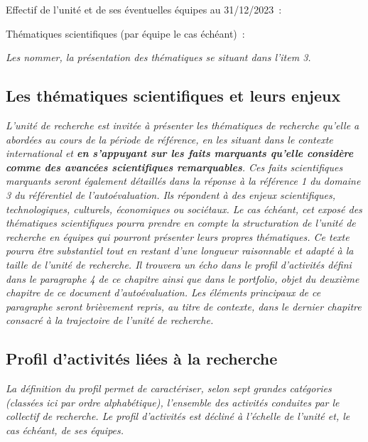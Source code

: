\documentclass[]{article}
\newcommand{\instructions}[1]{{\em \color{hceresgreen}#1}}
\begin{document}
Effectif de l'unité et de ses éventuelles équipes au 31/12/2023~:

Thématiques scientifiques (par équipe le cas échéant)~:

\instructions{Les nommer, la présentation des thématiques se situant dans l’item 3.}

\subsection{Les thématiques scientifiques et leurs enjeux}

\instructions{L’unité de recherche est invitée à présenter les thématiques de recherche qu’elle a abordées au cours de la période de référence, en les situant dans le contexte international et {\bf en s’appuyant sur les faits marquants qu’elle considère comme des avancées scientifiques remarquables}. Ces faits scientifiques marquants seront également détaillés dans la réponse à la référence 1 du domaine 3 du référentiel de l’autoévaluation. Ils répondent à des enjeux scientifiques, technologiques, culturels, économiques ou sociétaux. Le cas échéant, cet exposé des thématiques scientifiques pourra prendre en compte la structuration de l’unité de recherche en équipes qui pourront présenter leurs propres thématiques. Ce texte pourra être substantiel tout en restant d’une longueur raisonnable et adapté à la taille de l’unité de recherche. Il trouvera un écho dans le profil d’activités défini dans le paragraphe 4 de ce chapitre ainsi que dans le portfolio, objet du deuxième chapitre de ce document d’autoévaluation. Les éléments principaux de ce paragraphe seront brièvement repris, au titre de contexte, dans le dernier chapitre consacré à la trajectoire de l’unité de recherche.}

\subsection{Profil d'activités liées à la recherche}

\instructions{La définition du profil permet de caractériser, selon sept grandes catégories (classées ici par ordre alphabétique), l’ensemble des activités conduites par le collectif de recherche. Le profil d’activités est décliné à l’échelle de l’unité et, le cas échéant, de ses équipes.}
\end{document}
